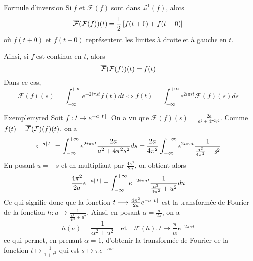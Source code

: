     \begin{theo}{Formule d’inversion}{}
        Si $f$ et $\mathcal{F}(f)$ sont dans $\mathcal{L}^1(f)$, alors 
        \[ \overline{\mathcal{F}}(\mathcal{F}(f))(t) = \frac{1}{2} \left[f(t+0) + f(t-0)\right] \] 
        où $f(t+0)$ et $f(t-0)$ représentent les limites à droite et à gauche en $t$.

        Ainsi, si $f$ est continue en $t$, alors 
        \[ \overline{\mathcal{F}}(\mathcal{F}(f))(t) = f(t) \] 
        Dans ce cas,
        \[ \mathcal{F}(f)(s) = \int_{-\infty}^{+\infty} e^{-2i\pi st}f(t)dt \iff f(t) = \int_{-\infty}^{+\infty} e^{2i\pi st} \mathcal{F}(f)(s)ds \]
    \end{theo}

    \begin{omed}{Exemple}{myred}
        Soit $f : t \mapsto e^{-a\left\lvert \,t \, \right\rvert}$. On a vu que $\mathcal{F}(f)(s) = \frac{2a}{a^2 + 4 \pi^2 s^2}$. Comme $f(t) = \overline{\mathcal{F}}(\mathcal{F})(f)(t)$, on a 
        \[ e^{-a\left\lvert \,t \, \right\rvert} = \int_{-\infty}^{+\infty} e^{2i \pi st} \frac{2a}{a^2 + 4 \pi^2 s^2} ds = \frac{2a}{4 \pi^2} \int_{-\infty}^{+\infty} e^{2i \pi s t} \frac{1}{\frac{a^2}{4\pi^2} + s^2} \] 
        En posant $u = -s$ et en multipliant par $\frac{4 \pi^2}{2a}$, on obtient alors 
        \[ \frac{4 \pi^2}{2a} e^{-a \left\lvert \,t \, \right\rvert} = \int_{-\infty}^{+\infty} e^{-2 i \pi u t} \frac{1}{\frac{a^2}{4\pi^2} + u^2} du \] 
        Ce qui signifie donc que la fonction $t \longmapsto \frac{4 \pi^2}{2a} e^{-a \left\lvert \,t \, \right\rvert}$ est la transformée de Fourier de la fonction $h : u \mapsto \frac{1}{\frac{a^2}{4\pi^2} + u^2}$. Ainsi, en posant $\alpha = \frac{a}{2\pi}$, on a 
        \[ h(u) = \frac{1}{\alpha^2 + u^2} \quad \text{et} \quad \mathcal{F}(h) : t \mapsto \frac{\pi}{\alpha} e^{-2 \pi \alpha t} \] 
        ce qui permet, en prenant $\alpha = 1$, d’obtenir la transformée de Fourier de la fonction $t \longmapsto \frac{1}{1+t^2}$ qui est $s \longmapsto \pi e^{-2 \pi s}$
    \end{omed}


    




    